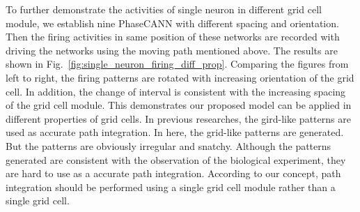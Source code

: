 \documentclass[final,5p,times,twocolumn]{elsarticle}
\begin{document}
To further demonstrate the activities of single neuron in different grid cell module, we establish nine PhaseCANN with different spacing and orientation. Then the firing activities in same position of these networks are recorded with driving the networks using the moving path mentioned above. The results are shown in Fig.~\ref{fig:single_neuron_firing_diff_prop}. Comparing the figures from left to right, the firing patterns are rotated with increasing orientation of the grid cell. In addition, the change of interval is consistent with the increasing spacing of the grid cell module. This demonstrates our proposed model can be applied in different properties of grid cells. In previous researches\citep{Bush2015,Edvardsen2020}, the gird-like patterns are used as accurate path integration. In here, the grid-like patterns are generated. But the patterns are obviously irregular and snatchy. Although the patterns generated are consistent with the observation of the biological experiment\citep{Hafting2005}, they are hard to use as a accurate path integration. According to our concept, path integration should be performed using a single grid cell module rather than a single grid cell.
\end{document}
